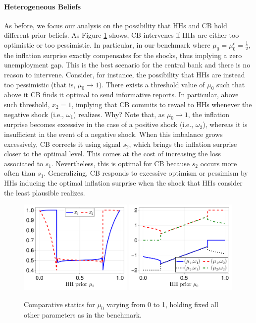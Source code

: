 \documentclass[12pt,a4paper]{article}
\begin{document}
\paragraph{Heterogeneous Beliefs}
As before, we focus our analysis on the possibility that HHs and CB hold different prior beliefs. As Figure \ref{Figure3} shows, CB intervenes if HHs are either too optimistic or too pessimistic. In particular, in our benchmark where $\mu_0=\mu_0^c=\frac{1}{2}$, the inflation surprise exactly compensates for the shocks, thus implying a zero unemployment gap. This is the best scenario for the central bank and there is no reason to intervene. Consider, for instance, the possibility that HHs are instead too pessimistic (that is, $\mu_0\to 1$). There exists a threshold value of $\mu_0$ such that above it CB finds it optimal to send informative reports. In particular, above such threshold, $x_2=1$, implying that CB commits to revael to HHs whenever the negative shock (i.e., $\omega_1$) realizes. Why? Note that, as $\mu_0\to 1$, the inflation surprise becomes excessive in the case of a positive shock (i.e., $\omega_2$), whereas it is insufficient in the event of a negative shock. When this imbalance grows excessively, CB corrects it using signal $s_2$, which brings the inflation surprise closer to the optimal level. This comes at the cost of increasing the loss associated to $s_1$. Nevertheless, this is optimal for CB because $s_2$ occurs more often than $s_1$. Generalizing, CB responds to excessive optimism or pessimism by HHs inducing the optimal inflation surprise when the shock that HHs consider the least plausible realizes.

\begin{figure}[H]
\centering
\includegraphics[width=0.49\textwidth]{figures/V11/γ=1.0-μ_0=0.5-α=1.0-θ=1.0-δ=0.5-ω_1=1.0-ω_2=-1.0/communication/fig_optimal_x_by_μ_0.pdf}
\includegraphics[width=0.49\textwidth]{figures/V11/γ=1.0-μ_0=0.5-α=1.0-θ=1.0-δ=0.5-ω_1=1.0-ω_2=-1.0/communication/fig_optimal_γ_by_μ_0.pdf}
\caption{Comparative statics for $\mu_0$ varying from 0 to 1, holding fixed all other parameters as in the benchmark.}
\label{Figure3}
\end{figure}
\end{document}

